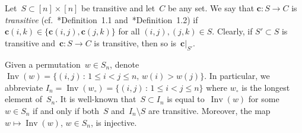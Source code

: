 \documentclass[12pt, reqno]{amsart}
\theoremstyle{definition}
\numberwithin{equation}{section}
\DeclareMathOperator{\Inv}{Inv}
\begin{document}
Let~$S\subset [n]\times[n]$ be transitive and let~$C$ be any set. We say that 
$\mathbf c:S\to C$
is {\em transitive} (cf.~\cite{ABGJ}*{Definition~1.1} and~\cite{ABGJepr}*{Definition~1.2}) if 
$\mathbf c(i,k)\in \{ \mathbf c(i,j),\mathbf c(j,k)\}$ for all $(i,j),(j,k)\in S$. Clearly, if $S'\subset S$ is transitive
and~$\mathbf c:S\to C$ is transitive, then so is~$\mathbf c|_{S'}$.




Given a permutation~$w\in S_n$, denote~$\Inv(w)=\{ (i,j)\,:\,
1\le i<j\le n,\, w(i)>w(j)\}$. In particular, we abbreviate 
$I_n=\Inv(w_\circ)=\{ (i,j)\,:\, 1\le i<j\le n\}$ where 
$w_\circ$ is the longest element of~$S_n$.
It is well-known
that~$S\subset I_n$ is equal to~$\Inv(w)$ for some~$w\in S_n$
if and only if both~$S$ and~$I_n\setminus S$ are transitive. Moreover, the map~$w\mapsto \Inv(w)$, $w\in S_n$, is injective. 
\end{document}
